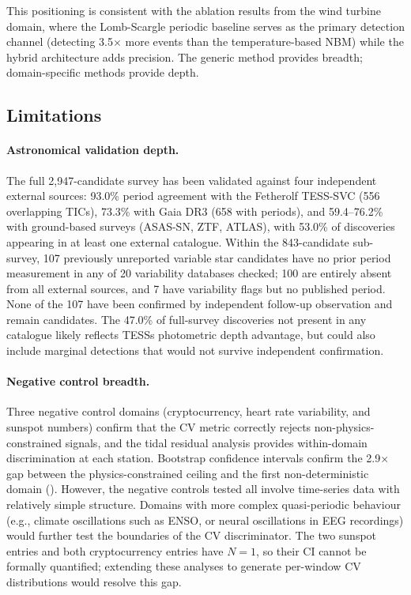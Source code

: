 \documentclass[11pt,a4paper]{article}
\begin{document}
This positioning is consistent with the ablation results from the wind turbine domain, where the Lomb-Scargle periodic baseline serves as the primary detection channel (detecting 3.5$\times$ more events than the temperature-based NBM) while the hybrid architecture adds precision. The generic method provides breadth; domain-specific methods provide depth.

\subsection{Limitations}
\label{sec:limitations}

\paragraph{Astronomical validation depth.} The full 2{,}947-candidate survey has been validated against four independent external sources: 93.0\% period agreement with the Fetherolf TESS-SVC (556 overlapping TICs), 73.3\% with Gaia DR3 (658 with periods), and 59.4--76.2\% with ground-based surveys (ASAS-SN, ZTF, ATLAS), with 53.0\% of discoveries appearing in at least one external catalogue. Within the 843-candidate sub-survey, 107 previously unreported variable star candidates have no prior period measurement in any of 20 variability databases checked; 100 are entirely absent from all external sources, and 7 have variability flags but no published period. None of the 107 have been confirmed by independent follow-up observation and remain candidates. The 47.0\% of full-survey discoveries not present in any catalogue likely reflects TESS\textquotesingle{}s photometric depth advantage, but could also include marginal detections that would not survive independent confirmation.

\paragraph{Negative control breadth.} Three negative control domains (cryptocurrency, heart rate variability, and sunspot numbers) confirm that the CV metric correctly rejects non-physics-constrained signals, and the tidal residual analysis provides within-domain discrimination at each station. Bootstrap confidence intervals confirm the 2.9$\times$ gap between the physics-constrained ceiling and the first non-deterministic domain (). However, the negative controls tested all involve time-series data with relatively simple structure. Domains with more complex quasi-periodic behaviour (e.g., climate oscillations such as ENSO, or neural oscillations in EEG recordings) would further test the boundaries of the CV discriminator. The two sunspot entries and both cryptocurrency entries have $N=1$, so their CI cannot be formally quantified; extending these analyses to generate per-window CV distributions would resolve this gap.
\end{document}
